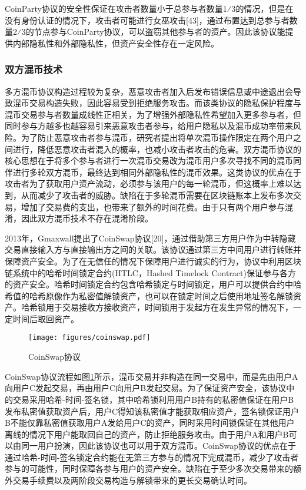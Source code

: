 CoinParty协议的安全性保证在攻击者数量小于总参与者数量1⁄3的情况，但是在没有身份认证的情况下，攻击者可能进行女巫攻击[43]，通过布置达到总参与者数量2⁄3的节点参与CoinParty协议，可以盗窃其他参与者的资产。因此该协议能提供内部隐私性和外部隐私性，但资产安全性存在一定风险。

\subsubsection{双方混币技术}

多方混币协议构造过程较为复杂，恶意攻击者加入后发布错误信息或中途退出会导致混币交易构造失败，因此容易受到拒绝服务攻击。而该类协议的隐私保护程度与混币交易参与者数量成线性正相关，为了增强外部隐私性希望加入更多参与者，但同时参与方越多也越容易引来恶意攻击者参与，给用户隐私以及混币成功率带来风险。为了防止恶意攻击者参与混币，研究者提出将单次混币操作限定在两个用户之间进行，降低恶意攻击者混入的概率，也减小攻击者攻击的危害。双方混币协议的核心思想在于将多个参与者进行一次混币交易改为混币用户多次寻找不同的混币同伴进行多轮双方混币，最终达到相同外部隐私性的混币效果。这类协议的优点在于攻击者为了获取用户资产流动，必须参与该用户的每一轮混币，但这概率上难以达到，从而减少了攻击者的威胁。缺陷在于多轮混币需要在区块链账本上发布多次交易，增加了交易费的支出，也带来了额外的时间花费。由于只有两个用户参与混淆，因此双方混币技术不存在混淆阶段。

2013年，Gmaxwall提出了CoinSwap协议[20]，通过借助第三方用户作为中转隐藏交易直接输入方与直接输出方之间的关联。该协议通过第三方中间用户进行转账并保障资产安全。为了在无信任的情况下保障用户进行诚实的行为，协议中利用区块链系统中的哈希时间锁定合约(HTLC，Hashed Timelock Contract)保证参与各方的资产安全。哈希时间锁定合约包含哈希锁定与时间锁定，用户可以提供合约中哈希值的哈希原像作为私密值解锁资产，也可以在锁定时间之后使用地址签名解锁资产。哈希锁用于交易接收方接收资产，时间锁用于发起方在发生异常的情况下，一定时间后取回资产。
 
\begin{figure}
\centering
\texttt{[image: figures/coinswap.pdf]}
\caption{CoinSwap协议}
\label{fig:coinswap}
\end{figure}

CoinSwap协议流程如图\ref{fig:coinswap}所示，混币交易并非构造在同一交易中，而是先由用户A向用户C发起交易，再由用户C向用户B发起交易。为了保证资产安全，该协议中的交易采用哈希-时间-签名锁，其中哈希锁利用用户B持有的私密值保证在用户B发布私密值获取资产后，用户C得知该私密值才能获取相应资产，签名锁保证用户B不能仅靠私密值获取用户A发给用户C的资产，同时采用时间锁保证在其他用户离线的情况下用户能取回自己的资产，防止拒绝服务攻击。由于用户A和用户B可以由同一用户扮演，因此该协议也可以用于双方混币。CoinSwap协议的优点在于通过哈希-时间-签名锁定合约能在无第三方参与的情况下完成混币，减少了攻击者参与的可能性，同时保障各参与用户的资产安全。缺陷在于至少多次交易带来的额外交易手续费以及两阶段交易构造与解锁带来的更长交易确认时间。

